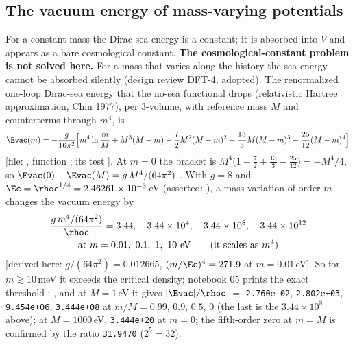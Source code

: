 \subsection{The vacuum energy of mass-varying potentials}
\label{sec:7.11}

For a constant mass the Dirac-sea energy is a constant; it is absorbed into $V$ and appears as a bare
cosmological constant. \textbf{The cosmological-constant problem is not solved here.} For a mass that
varies along the history the sea energy cannot be absorbed silently (design review DFT-4, adopted). The
renormalized one-loop Dirac-sea energy that the no-sea functional drops (relativistic Hartree
approximation, Chin 1977), per 3-volume, with reference mass $M$ and counterterms through $m^4$, is
\[
  \Evac(m)=-\frac{g}{16\pi^2}\Bigl[m^4\ln\frac mM+M^3(M-m)-\frac72M^2(M-m)^2+\frac{13}{3}M(M-m)^3-\frac{25}{12}(M-m)^4\Bigr]
\]
[file: , function ; its test
]. At $m=0$ the
bracket is $M^4\bigl(1-\tfrac72+\tfrac{13}{3}-\tfrac{25}{12}\bigr)=-M^4/4$, so
$\Evac(0)-\Evac(M)=g\,M^4/(64\pi^2)$ \cfderived. With $g=8$ and $\Ec=\rhoc^{1/4}=2.46261\times10^{-3}$\,eV
(asserted: ), a mass variation of order $m$ changes the vacuum energy by
\begin{gather*}
  \frac{g\,m^4/(64\pi^2)}{\rhoc}=3.44,\quad 3.44\times10^{4},\quad 3.44\times10^{8},\quad 3.44\times10^{12}\\
  \text{at } m=0.01,\ 0.1,\ 1,\ 10\ \text{eV}\qquad\text{(it scales as $m^4$)}
\end{gather*}
[derived here: $g/(64\pi^2)=0.012665$, $(m/\Ec)^4=271.9$ at $m=0.01$\,eV]. So for $m\gtrsim10$\,meV it
exceeds the critical density; notebook 05 prints the exact threshold :
,
and at $M=1$\,eV it gives $|\Evac|/\rhoc$ $=$ \texttt{2.760e-02}, \texttt{2.802e+03}, \texttt{9.454e+06},
\texttt{3.444e+08} at $m/M=0.99$, $0.9$, $0.5$, $0$ (the last is the $3.44\times10^{8}$ above); at
$M=1000$\,eV, \texttt{3.444e+20} at $m=0$; the fifth-order zero at $m=M$ is confirmed by the ratio
\texttt{31.9470} ($2^5=32$).

